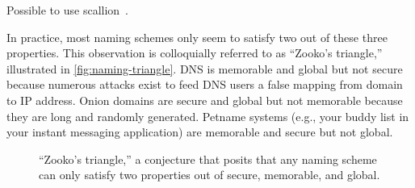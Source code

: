 Possible to use scallion~\cite{scallion}.

In practice, most naming schemes only seem to satisfy two out of these three
properties.  This observation is colloquially referred to as ``Zooko's
triangle,'' illustrated in \autoref{fig:naming-triangle}.  DNS is memorable
and global but not secure because numerous attacks exist to feed DNS users a
false mapping from domain to IP address.  Onion domains are secure and global
but not memorable because they are long and randomly generated.  Petname systems
(e.g., your buddy list in your instant messaging application) are memorable and
secure but not global.

\begin{figure}
\centering
{}
\caption{``Zooko's triangle,'' a conjecture that posits that any naming scheme
can only satisfy two properties out of secure, memorable, and global.}
\label{fig:naming-triangle}
\end{figure}
